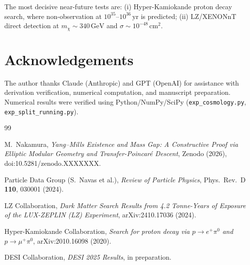 \documentclass[12pt]{article}
\theoremstyle{plain}
\theoremstyle{definition}
\numberwithin{equation}{section}
\begin{document}
The most decisive near-future tests are: (i) Hyper-Kamiokande proton
decay search, where non-observation at $10^{35}$--$10^{36}\,\mathrm{yr}$
is predicted; (ii) LZ/XENONnT direct detection at $m_\chi\sim340\,\mathrm{GeV}$
and $\sigma\sim10^{-48}\,\mathrm{cm}^2$.

\section*{Acknowledgements}

The author thanks Claude (Anthropic) and GPT (OpenAI) for assistance with
derivation verification, numerical computation, and manuscript preparation.
Numerical results were verified using Python/NumPy/SciPy
(\texttt{exp\_cosmology.py}, \texttt{exp\_split\_running.py}).

\begin{thebibliography}{99}

M.~Nakamura,
\textit{Yang--Mills Existence and Mass Gap: A Constructive Proof via
Elliptic Modular Geometry and Transfer-Poincar\'e Descent},
Zenodo (2026), doi:10.5281/zenodo.XXXXXXX.

Particle Data Group (S.~Navas et al.),
\textit{Review of Particle Physics},
Phys.\ Rev.\ D \textbf{110}, 030001 (2024).

LZ Collaboration,
\textit{Dark Matter Search Results from 4.2 Tonne-Years of Exposure
of the LUX-ZEPLIN (LZ) Experiment},
arXiv:2410.17036 (2024).

Hyper-Kamiokande Collaboration,
\textit{Search for proton decay via $p\to e^+\pi^0$ and $p\to\mu^+\pi^0$},
arXiv:2010.16098 (2020).

DESI Collaboration,
\textit{DESI 2025 Results},
in preparation.

\end{thebibliography}
\end{document}
